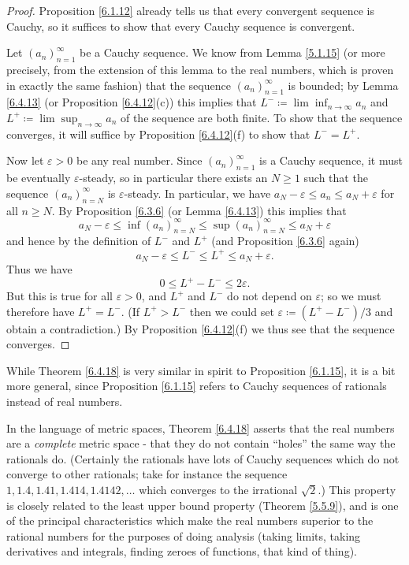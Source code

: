 \begin{proof}
Proposition \ref{6.1.12} already tells us that every convergent sequence is Cauchy, so it suffices to show that every Cauchy sequence is convergent.

Let \((a_n)_{n = 1}^\infty\) be a Cauchy sequence.
We know from Lemma \ref{5.1.15} (or more precisely, from the extension of this lemma to the real numbers, which is proven in exactly the same fashion) that the sequence \((a_n)_{n = 1}^\infty\) is bounded;
by Lemma \ref{6.4.13} (or Proposition \ref{6.4.12}(c)) this implies that \(L^- \coloneqq \lim\inf_{n \to \infty} a_n\) and \(L^+ \coloneqq \lim\sup_{n \to \infty} a_n\) of the sequence are both finite.
To show that the sequence converges, it will suffice by Proposition \ref{6.4.12}(f) to show that \(L^- = L^+\).

Now let \(\varepsilon > 0\) be any real number.
Since \((a_n)_{n = 1}^\infty\) is a Cauchy sequence, it must be eventually \(\varepsilon\)-steady, so in particular there exists an \(N \geq 1\) such that the sequence \((a_n)_{n = N}^\infty\) is \(\varepsilon\)-steady.
In particular, we have \(a_N - \varepsilon \leq a_n \leq a_N + \varepsilon\) for all \(n \geq N\).
By Proposition \ref{6.3.6} (or Lemma \ref{6.4.13}) this implies that
\[
    a_N - \varepsilon \leq \inf(a_n)_{n = N}^\infty \leq \sup(a_n)_{n = N}^\infty \leq a_N + \varepsilon
\]
and hence by the definition of \(L^-\) and \(L^+\) (and Proposition \ref{6.3.6} again)
\[
    a_N - \varepsilon \leq L^- \leq L^+ \leq a_N + \varepsilon.
\]
Thus we have
\[
    0 \leq L^+ - L^- \leq 2\varepsilon.
\]
But this is true for all \(\varepsilon > 0\), and \(L^+\) and \(L^-\) do not depend on \(\varepsilon\);
so we must therefore have \(L^+ = L^-\).
(If \(L^+ > L^-\) then we could set \(\varepsilon \coloneqq (L^+ - L^-) / 3\) and obtain a contradiction.)
By Proposition \ref{6.4.12}(f) we thus see that the sequence converges.
\end{proof}

\begin{remark}\label{6.4.19}
While Theorem \ref{6.4.18} is very similar in spirit to Proposition \ref{6.1.15}, it is a bit more general, since Proposition \ref{6.1.15} refers to Cauchy sequences of rationals instead of real numbers.
\end{remark}

\begin{remark}\label{6.4.20}
In the language of metric spaces, Theorem \ref{6.4.18} asserts that the real numbers are a \emph{complete} metric space
- that they do not contain ``holes'' the same way the rationals do.
(Certainly the rationals have lots of Cauchy sequences which do not converge to other rationals;
take for instance the sequence \(1, 1.4, 1.41, 1.414, 1.4142, \dots\) which converges to the irrational \(\sqrt{2}\).)
This property is closely related to the least upper bound property (Theorem \ref{5.5.9}), and is one of the principal characteristics which make the real numbers superior to the rational numbers for the purposes of doing analysis
(taking limits, taking derivatives and integrals, finding zeroes of functions, that kind of thing).
\end{remark}

